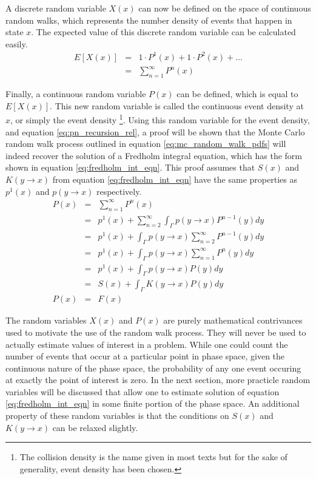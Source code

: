 A discrete random variable $X(x)$ can now be defined on the space of continuous
random walks, which represents the number density of events that happen in 
state $x$. The expected value of this discrete random variable can be calculated
easily.
\begin{eqnarray}
  E[X(x)] & = & 1 \cdot P^1(x) + 1 \cdot P^2(x) + \ldots \nonumber \\
  & = & \sum_{n=1}^{\infty} P^n(x)
  \label{eq:expec_coll_dens}
\end{eqnarray}

Finally, a continuous random variable $P(x)$ can be defined, which is equal to
$E[X(x)]$. This new random variable is called the continuous event density 
at $x$, or simply the event density
\footnote{The collision density is the name given in most texts but for the
sake of generality, event density has been chosen.}. Using this random variable 
for the event density, and equation \ref{eq:pn_recursion_rel}, a proof will be 
shown that the Monte Carlo random walk process outlined in equation 
\ref{eq:mc_random_walk_pdfs} will indeed recover the solution of a Fredholm 
integral equation, which has the form shown in equation 
\ref{eq:fredholm_int_eqn}. This proof assumes that $S(x)$ and $K(y \to x)$ from 
equation \ref{eq:fredholm_int_eqn} have the same properties as $p^1(x)$ and 
$p(y \to x)$ respectively. 
\begin{eqnarray}
  P(x) & = & \sum_{n=1}^{\infty} P^n(x) \nonumber \\
  & = & p^1(x) + \sum_{n=2}^{\infty} \int_{\Gamma} p(y \to x) P^{n-1}(y)dy \nonumber\\
  & = & p^1(x) + \int_{\Gamma} p(y \to x) \sum_{n=2}^{\infty} P^{n-1}(y)dy \nonumber\\
  & = & p^1(x) + \int_{\Gamma} p(y \to x) \sum_{n=1}^{\infty} P^{n}(y)dy \nonumber\\
  & = & p^1(x) + \int_{\Gamma} p(y \to x) P(y)dy \nonumber \\
  & = & S(x) + \int_{\Gamma} K(y \to x) P(y)dy \nonumber \\
  P(x) & = & F(x) \nonumber
\end{eqnarray}

The random variables $X(x)$ and $P(x)$ are purely mathematical contrivances
used to motivate the use of the random walk process. They will never be used 
to actually estimate values of interest in a problem. While one could count the
number of events that occur at a particular point in phase space, given the 
continuous nature of the phase space, the probability of any one event 
occuring at exactly the point of interest is zero. In the next section, more 
practicle random variables will be discussed that allow one to estimate 
solution of equation \ref{eq:fredholm_int_eqn} in some finite portion of the 
phase space. An additional property of these random variables is that the 
conditions on $S(x)$ and $K(y \to x)$ can be relaxed slightly.

